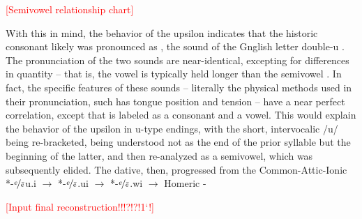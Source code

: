 \documentclass[draft]{turabian-researchpaper}
\begin{document}
\textcolor{red}{[Semivowel relationship chart]}
%

With this in mind, the behavior of the upsilon  indicates
that the historic consonant likely was pronounced as ,
the sound of the Gnglish letter double-u . 
The pronunciation of the two sounds are near-identical, excepting
for differences in quantity -- that is, the vowel  is typically
held longer than the semivowel . In fact, the specific features
of these sounds -- literally the physical methods used in their pronunciation,
such has tongue position and tension -- have a near perfect correlation,
except that  is labeled as a consonant and  a vowel.
This would explain the behavior of the upsilon  in u-type
endings, with the short, intervocalic /u/ being re-bracketed, being
understood not as the end of the prior syllable but the beginning of the
latter, and then re-analyzed as a semivowel, which was subsequently elided.
The dative, then, progressed from the Common-Attic-Ionic
*-$\nicefrac{e}{\bar{e}}$u.i $\to$ *-$\nicefrac{e}{\bar{e}}$.ui $\to$
*-$\nicefrac{e}{\bar{e}}$.wi $\to$ Homeric
-

\textcolor{red}{[Input final reconstruction!!!?!?!1`!]}
\end{document}
